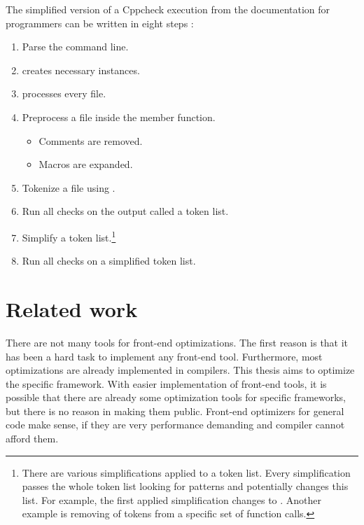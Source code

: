 The simplified version of a Cppcheck execution from the documentation for programmers can be written in eight steps \cite{cppcheck-doxygen}:

\begin{enumerate}
\item Parse the command line.
\item {} creates necessary  instances.
\item {} processes every file.
\item Preprocess a file inside the  member function.
    \begin{itemize}
    \item Comments are removed.
    \item Macros are expanded.
    \end{itemize}
\item Tokenize a file using .
\item Run all checks on the  output called a token list.
\item Simplify a token list.\footnote{There are various simplifications applied to a token list. Every simplification passes the whole token list looking for patterns and potentially changes this list. For example, the first applied simplification changes  to . Another example is removing of  tokens from a specific set of function calls.}
\item Run all checks on a simplified token list.
\end{enumerate}

\section{Related work}
There are not many tools for front-end optimizations. The first reason is that it has been a hard task to implement any front-end tool. Furthermore, most optimizations are already implemented in compilers. This thesis aims to optimize the specific framework. With easier implementation of front-end tools, it is possible that there are already some optimization tools for specific frameworks, but there is no reason in making them public. Front-end optimizers for general code make sense, if they are very performance demanding and compiler cannot afford them.


